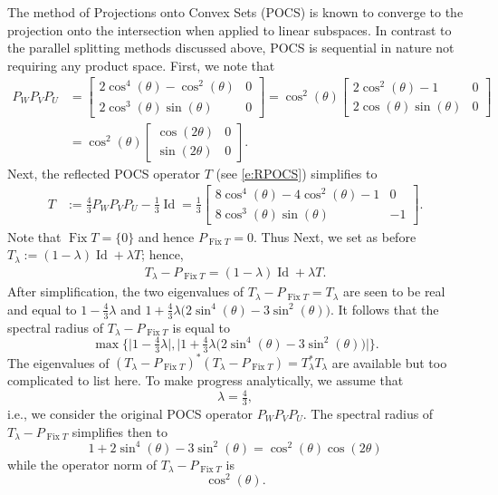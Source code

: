 \documentclass[11pt]{article}
\newcommand{\Fix}{\ensuremath{\operatorname{Fix}}}
\newcommand{\Id}{\ensuremath{\operatorname{Id}}}
\theoremstyle{definition}
\providecommand{\Id}{\operatorname{{ Id}}}
\providecommand{\Id}{\operatorname{Id}}
\begin{document}
{{The method of Projections onto Convex Sets (POCS) is known to converge to the projection onto the intersection when applied to linear subspaces. In contrast to the parallel splitting methods discussed above, POCS is sequential in nature not requiring any product space. 
First, we note that 
\begin{align*}
P_{W}P_{V}P_{U}
&= 
\begin{bmatrix} 2  \cos^4(\theta) - \cos^2(\theta) & 0 \\
2 \cos^3(\theta)\sin(\theta) & 0
\end{bmatrix}
= 
\cos^2(\theta)
\begin{bmatrix} 2\cos^2(\theta) - 1 & 0 \\
2 \cos(\theta)\sin(\theta) & 0
\end{bmatrix}\\
&=
\cos^2(\theta)
\begin{bmatrix} \cos(2\theta) & 0 \\
\sin(2\theta) & 0
\end{bmatrix}. 
\end{align*}
Next, the reflected POCS operator $T$ (see \cref{e:RPOCS}) simplifies to 
\begin{align*}
T &:= \tfrac{4}{3}P_WP_VP_U-\tfrac{1}{3}\Id
=\tfrac{1}{3}\begin{bmatrix}
{8}\cos^4({\theta}) - {4}\cos^2({\theta}) - {1} & 0 \\
{8}\cos^3({\theta}) \sin({\theta}) & -{1}
\end{bmatrix}.
\end{align*}
Note that $\Fix T=\{0\}$  and hence $P_{\Fix T}=0$. 
Thus 
Next, we set as before 
$T_\lambda := (1-\lambda)\Id + \lambda T$; hence, 
\begin{align*}
T_\lambda-P_{\Fix T}
= (1-\lambda)\Id + \lambda T. 
\end{align*}
After simplification, the two eigenvalues of $T_\lambda-P_{\Fix T}=T_\lambda$ are seen to be real
and equal to $1-\tfrac{4}{3}\lambda$ and $1+\tfrac{4}{3}\lambda\big(2\sin^4(\theta)-3\sin^2(\theta))$. 
It follows that the spectral radius of
$T_\lambda-P_{\Fix T}$ is equal to 
\begin{equation*}
\max\big\{\big|1-\tfrac{4}{3}\lambda\big|,
\big|1+\tfrac{4}{3}\lambda\big(2\sin^4(\theta)-3\sin^2(\theta)\big)\big| \big\}. 
\end{equation*}
The eigenvalues of $(T_\lambda-P_{\Fix T})^*(T_\lambda-P_{\Fix T})
= T_\lambda^*T_\lambda$ are available but too complicated to list here.
To make progress analytically, we assume that
\begin{equation*}
\lambda = \tfrac{4}{3},
\end{equation*}
i.e., we consider the original POCS operator $P_WP_VP_U$. 
The spectral radius of $T_\lambda-P_{\Fix T}$ simplifies then to 
\begin{equation*}
1+2\sin^4(\theta)-3\sin^2(\theta)=\cos^2(\theta)\cos(2\theta)
\end{equation*}
while the operator norm of $T_\lambda-P_{\Fix T}$ is 
\begin{equation*}
\cos^2(\theta). 
\end{equation*}


}}
\end{document}
